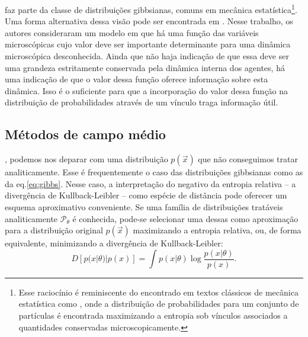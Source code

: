  faz parte da classe de distribuições gibbsianas, comuns em mecânica estatística\footnote{Esse raciocínio é reminiscente do encontrado em textos clássicos de mecânica estatística como \citet{Landau1980}, onde a distribuição de probabilidades para um conjunto de partículas é encontrada maximizando a entropia sob vínculos associados a quantidades conservadas microscopicamente.}\cite{Landau1980}. Uma forma alternativa dessa visão pode ser encontrada\cite{NCaticha2011} em \citet{NCaticha2011}. Nesse trabalho, os autores consideraram um modelo em que há uma função das variáveis microscópicas cujo valor deve ser importante determinante para uma dinâmica microscópica desconhecida. Ainda que não haja indicação de que essa deve ser uma grandeza estritamente conservada pela dinâmica interna dos agentes, há uma indicação de que o valor dessa função oferece informação sobre esta dinâmica. Isso é o suficiente para que a incorporação do valor dessa função na distribuição de probabilidades através de um vínculo traga informação útil. 

\subsection{Métodos de campo médio}
\label{sec:meanfield}
, podemos nos deparar com uma distribuição $p(\vec{x})$ que não conseguimos tratar analiticamente. Esse é frequentemente o caso das distribuições gibbsianas como as da eq.\eqref{eq:gibbs}. Nesse caso, a interpretação do negativo da entropia relativa -- a divergência de Kullback-Leibler -- como espécie de distância pode oferecer um esquema aproximativo conveniente. Se uma família de distribuições tratáveis analiticamente $\mathcal{P}_\theta$ é conhecida, pode-se selecionar uma dessas como aproximação para a distribuição original $p(\vec{x})$ maximizando a entropia relativa, ou, de forma equivalente, minimizando a divergência de Kullback-Leibler:
\begin{equation}
 D[ p(x|\theta)|p(x) ] = \int p(x|\theta) \log\frac{p(x|\theta)}{p(x)}.
\end{equation}
\clarificationneeded


